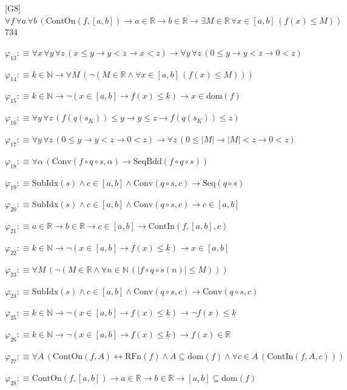 \begin{fullproof}{[G8]}{$\forall f\,\forall a\,\forall b\,(\mathrm{ContOn}(f,[a,b]) \to a \in \mathbb{R} \to b \in \mathbb{R} \to \exists M \in \mathbb{R}\,\forall x \in [a,b]\,(f(x) \leq M))$}{734}
\begin{abbrevlist}
\item $\varphi_{13} :\equiv \forall x\,\forall y\,\forall z\,(x \leq y \to y < z \to x < z) \to \forall y\,\forall z\,(0 \leq y \to y < z \to 0 < z)$
\item $\varphi_{14} :\equiv k \in \mathbb{N} \to \forall M\,(\neg (M \in \mathbb{R} \land \forall x \in [a,b]\,(f(x) \leq M)))$
\item $\varphi_{15} :\equiv k \in \mathbb{N} \to \neg (x \in [a,b] \to f(x) \leq \underline{k}) \to x \in \mathrm{dom}(f)$
\item $\varphi_{16} :\equiv \forall y\,\forall z\,(f(q(s_{K})) \leq y \to y \leq z \to f(q(s_{K})) \leq z)$
\item $\varphi_{17} :\equiv \forall y\,\forall z\,(0 \leq y \to y < z \to 0 < z) \to \forall z\,(0 \leq \lvert M \rvert \to \lvert M \rvert < z \to 0 < z)$
\item $\varphi_{18} :\equiv \forall \alpha\,(\mathrm{Conv}(f \circ q \circ s,\alpha) \to \mathrm{SeqBdd}(f \circ q \circ s))$
\item $\varphi_{19} :\equiv \mathrm{SubIdx}(s) \land c \in [a,b] \land \mathrm{Conv}(q \circ s,c) \to \mathrm{Seq}(q \circ s)$
\item $\varphi_{20} :\equiv \mathrm{SubIdx}(s) \land c \in [a,b] \land \mathrm{Conv}(q \circ s,c) \to c \in [a,b]$
\item $\varphi_{21} :\equiv a \in \mathbb{R} \to b \in \mathbb{R} \to c \in [a,b] \to \mathrm{ContIn}(f,[a,b],c)$
\item $\varphi_{22} :\equiv k \in \mathbb{N} \to \neg (x \in [a,b] \to f(x) \leq \underline{k}) \to x \in [a,b]$
\item $\varphi_{23} :\equiv \forall M\,(\neg (M \in \mathbb{R} \land \forall n \in \mathbb{N}\,(\lvert f \circ q \circ s(n) \rvert \leq M)))$
\item $\varphi_{24} :\equiv \mathrm{SubIdx}(s) \land c \in [a,b] \land \mathrm{Conv}(q \circ s,c) \to \mathrm{Conv}(q \circ s,c)$
\item $\varphi_{25} :\equiv k \in \mathbb{N} \to \neg (x \in [a,b] \to f(x) \leq \underline{k}) \to \neg f(x) \leq \underline{k}$
\item $\varphi_{26} :\equiv k \in \mathbb{N} \to \neg (x \in [a,b] \to f(x) \leq \underline{k}) \to f(x) \in \mathbb{R}$
\item $\varphi_{27} :\equiv \forall A\,(\mathrm{ContOn}(f,A) \leftrightarrow \mathrm{RFn}(f) \land A \subseteq \mathrm{dom}(f) \land \forall c \in A\,(\mathrm{ContIn}(f,A,c)))$
\item $\varphi_{28} :\equiv \mathrm{ContOn}(f,[a,b]) \to a \in \mathbb{R} \to b \in \mathbb{R} \to [a,b] \subseteq \mathrm{dom}(f)$

\end{abbrevlist}
\end{fullproof}
